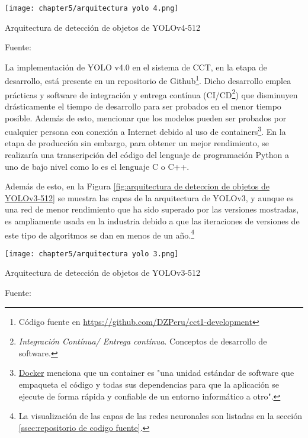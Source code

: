 \begin{myfigure}[H]
	\footnotesize\centering
	\texttt{[image: chapter5/arquitectura yolo 4.png]}
	\caption{Arquitectura de detección de objetos de YOLOv4-512}
	\begin{myflushcenter}
		Fuente: \cite{Solawetz2020}
	\end{myflushcenter}
	\label{fig:arquitectura de deteccion de objetos de YOLOv4-512}
\end{myfigure}

La implementación de YOLO v4.0 en el sistema de CCT, en la etapa de desarrollo, está presente en un repositorio de Github\footnote{ Código fuente en \href{https://github.com/DZPeru/cct1-development}{https://github.com/DZPeru/cct1-development}}. Dicho desarrollo emplea prácticas y software de integración y entrega contínua (CI/CD\footnote{\textit{Integración Contínua/ Entrega contínua}. Conceptos de desarrollo de software.}) que disminuyen drásticamente el tiempo de desarrollo para ser probados en el menor tiempo posible. Además de esto, mencionar que los modelos pueden ser probados por cualquier persona con conexión a Internet debido al uso de containers\footnote{\href{https://www.docker.com/resources/what-container}{Docker} menciona que un container es "una unidad estándar de software que empaqueta el código y todas sus dependencias para que la aplicación se ejecute de forma rápida y confiable de un entorno informático a otro".}. En la etapa de producción sin embargo, para obtener un mejor rendimiento, se realizaría una transcripción del código del lenguaje de programación Python a uno de bajo nivel como lo es el lenguaje C o C++. 

Además de esto, en la Figura \ref{fig:arquitectura de deteccion de objetos de YOLOv3-512} se muestra las capas de la arquitectura de YOLOv3, y aunque es una red de menor rendimiento que ha sido superado por las versiones mostradas, es ampliamente usada en la industria debido a que las iteraciones de versiones de este tipo de algoritmos se dan en menos de un año.\footnote{La visualización de las capas de las redes neuronales son listadas en la sección \ref{ssec:repositorio de codigo fuente}.}

\begin{myfigure}[H]
	\footnotesize\centering
	\texttt{[image: chapter5/arquitectura yolo 3.png]}
	\caption{Arquitectura de detección de objetos de YOLOv3-512}
	\begin{myflushcenter}
		Fuente: \cite{Redmon2018}
	\end{myflushcenter}
	\label{fig:arquitectura de deteccion de objetos de YOLOv3-512}
\end{myfigure}

